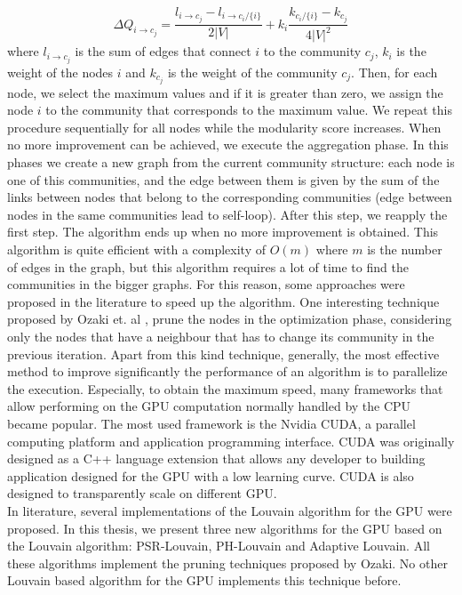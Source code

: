 \begin{equation}\label{intro_Delta}
\Delta Q_{i \rightarrow c_j} = \frac{l_{i\rightarrow c_j} - l_{i\rightarrow c_i / \{i\}}}{2|V|} + k_i \frac{k_{c_i / \{i\}} - k_{c_j}}{4|V|^2}
\end{equation}
where $l_{i\rightarrow c_j}$ is the sum of edges that connect $i$ to the community $c_j$, $k_i$ is the weight of the nodes $i$ and $k_{c_j}$ is the weight of the community $c_j$. Then, for each node, we select the maximum values and if it is greater than zero, we assign the node $i$ to the community that corresponds to the maximum value. We repeat this procedure sequentially for all nodes while the modularity score increases. When no more improvement can be achieved, we execute the aggregation phase. In this phases we create a new graph from the current community structure: each node is one of this communities, and the edge between them is given by the sum of the links between nodes that belong to the corresponding communities (edge between nodes in the same communities lead to self-loop). After this step, we reapply the first step. The algorithm ends up when no more improvement is obtained.
This algorithm is quite efficient with a complexity of $O(m)$ where $m$ is the number of edges in the graph, but this algorithm requires a lot of time to find the communities in the bigger graphs. For this reason, some approaches were proposed in the literature to speed up the algorithm. One interesting technique proposed by Ozaki et. al \cite{pruning}, prune the nodes in the optimization phase, considering only the nodes that have a neighbour that has to change its community in the previous iteration. Apart from this kind technique, generally, the most effective method to improve significantly the performance of an algorithm is to parallelize the execution. Especially, to obtain the maximum speed, many frameworks that allow performing on the GPU computation normally handled by the CPU became popular. The most used framework is the Nvidia CUDA, a parallel computing platform and application programming interface. CUDA was originally designed as a C++ language extension that allows any developer to building application designed for the GPU with a low learning curve. CUDA is also designed to transparently scale on different GPU.\\
In literature, several implementations of the Louvain algorithm for the GPU were proposed. In this thesis, we present three new algorithms for the GPU based on the Louvain algorithm: PSR-Louvain, PH-Louvain and Adaptive Louvain. All these algorithms implement the pruning techniques proposed by Ozaki. No other Louvain based algorithm for the GPU implements this technique before. 
